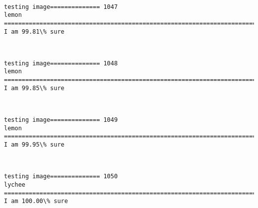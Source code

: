 \documentclass[11pt]{article}
\begin{document}
    \begin{center}
    \end{center}
    { \hspace*{\fill} \\}
    
    \begin{Verbatim}[commandchars=\\\{\}]
testing image============== 1047
lemon
============================================================================
I am 99.81\% sure

    \end{Verbatim}

    \begin{center}
    \end{center}
    { \hspace*{\fill} \\}
    
    \begin{Verbatim}[commandchars=\\\{\}]
testing image============== 1048
lemon
============================================================================
I am 99.85\% sure

    \end{Verbatim}

    \begin{center}
    \end{center}
    { \hspace*{\fill} \\}
    
    \begin{Verbatim}[commandchars=\\\{\}]
testing image============== 1049
lemon
============================================================================
I am 99.95\% sure

    \end{Verbatim}

    \begin{center}
    \end{center}
    { \hspace*{\fill} \\}
    
    \begin{Verbatim}[commandchars=\\\{\}]
testing image============== 1050
lychee
============================================================================
I am 100.00\% sure

    \end{Verbatim}
\end{document}
